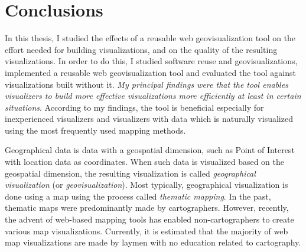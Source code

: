 
\chapter{Conclusions}
\label{chapter:conclusions}

In this thesis, I studied the effects of a reusable web geovisualization tool on the effort needed for building visualizations, and on the quality of the resulting visualizations. In order to do this, I studied software reuse and geovisualizations, implemented a reusable web geovisualization tool and evaluated the tool against visualizations built without it. \emph{My principal findings were that the tool enables visualizers to build more effective visualizations more efficiently at least in certain situations}. According to my findings, the tool is beneficial especially for inexperienced visualizers and visualizers with data which is naturally visualized using the most frequently used mapping methods.

Geographical data is data with a geospatial dimension, such as Point of Interest with location data as coordinates. When such data is visualized based on the geospatial dimension, the resulting visualization is called \emph{geographical visualization} (or \emph{geovisualization}). Most typically, geographical visualization is done using a map using the process called \emph{thematic mapping}. In the past, thematic maps were predominantly made by cartographers. However, recently, the advent of web-based mapping tools has enabled non-cartographers to create various map visualizations. Currently, it is estimated that the majority of web map visualizations are made by laymen with no education related to cartography.



